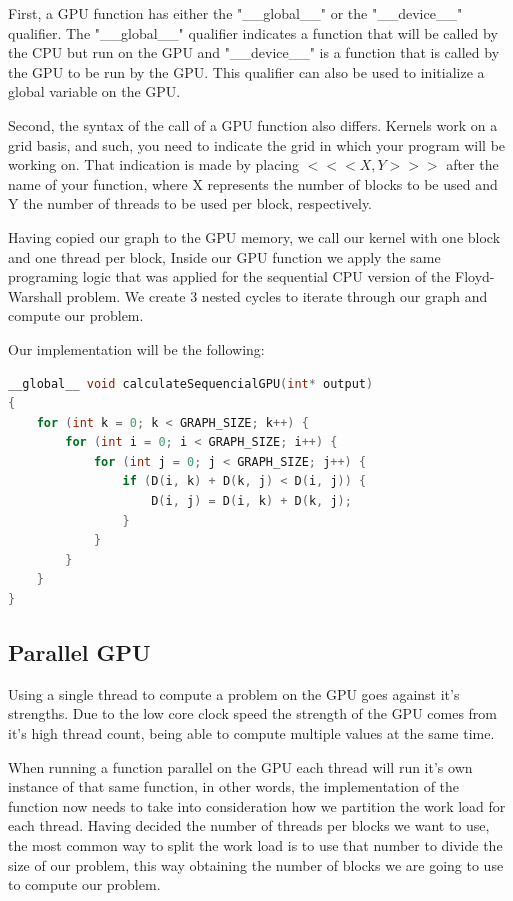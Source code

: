 \documentclass[conference]{IEEEtran}
\begin{document}
First, a GPU function has either the "\_\_global\_\_" or the "\_\_device\_\_" qualifier.
The "\_\_global\_\_" qualifier indicates a function that will be called by the CPU but run on the GPU and "\_\_device\_\_" is a function that is called by the GPU to be run by the GPU. 
This qualifier can also be used to initialize a global variable on the GPU.

Second, the syntax of the call of a GPU function also differs. Kernels work on a grid basis, and such, you need to indicate the grid in which your program will be working on. 
That indication is made by placing
\begin{math} <<< X, Y >>> \end{math}
after the name of your function, where X represents the number of blocks to be used and Y the number of threads to be used per block, respectively. 

Having copied our graph to the GPU memory, we call our kernel with one block and one thread per block, 
Inside our GPU function we apply the same programing logic that was applied for the sequential CPU version of the Floyd-Warshall problem. 
We create 3 nested cycles to iterate through our graph and compute our problem.

Our implementation will be the following:
\begin{lstlisting}[language=C++, caption=Sequential CUDA]
	__global__ void calculateSequencialGPU(int* output)
{
	for (int k = 0; k < GRAPH_SIZE; k++) {
		for (int i = 0; i < GRAPH_SIZE; i++) {
			for (int j = 0; j < GRAPH_SIZE; j++) {
				if (D(i, k) + D(k, j) < D(i, j)) {
					D(i, j) = D(i, k) + D(k, j);
				}
			}
		}
	}
}
\end{lstlisting}


\subsection{Parallel GPU}
Using a single thread to compute a problem on the GPU goes against it's strengths. 
Due to the low core clock speed the strength of the GPU comes from it's high thread count, being able to compute multiple values at the same time. 

When running a function parallel on the GPU each thread will run it's own instance of that same function, in other words, the implementation of the function now needs to take into consideration how we partition the work load for each thread. 
Having decided the number of threads per blocks we want to use, the most common way to split the work load is to use that number to divide the size of our problem, this way obtaining the number of blocks we are going to use to compute our problem. 
\end{document}
